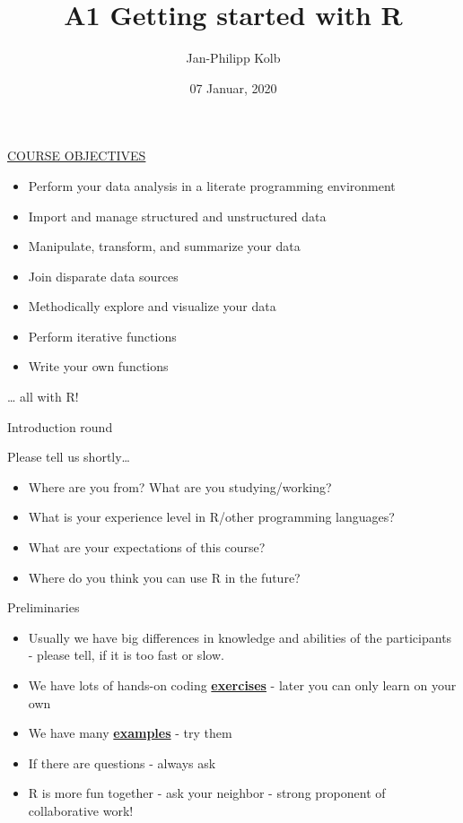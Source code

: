 \documentclass[
  10pt,
  ignorenonframetext,
]{beamer}
\title{A1 Getting started with R}
\author{Jan-Philipp Kolb}
\date{07 Januar, 2020}
\providecommand{\tightlist}{%
  \setlength{\itemsep}{0pt}\setlength{\parskip}{0pt}}
\begin{document}
\frame{\titlepage}

\begin{frame}{\href{http://uc-r.github.io/data_wrangling/week-1}{COURSE
OBJECTIVES}}
\protect\hypertarget{course-objectives}{}

\begin{itemize}
\tightlist
\item
  Perform your data analysis in a literate programming environment
\item
  Import and manage structured and unstructured data
\item
  Manipulate, transform, and summarize your data
\item
  Join disparate data sources
\item
  Methodically explore and visualize your data
\item
  Perform iterative functions
\item
  Write your own functions
\end{itemize}

\ldots{} all with R!

\end{frame}

\begin{frame}{Introduction round}
\protect\hypertarget{introduction-round}{}

\begin{block}{Please tell us shortly\ldots{}}

\begin{itemize}
\tightlist
\item
  Where are you from? What are you studying/working?
\item
  What is your experience level in R/other programming languages?
\item
  What are your expectations of this course?
\item
  Where do you think you can use R in the future?
\end{itemize}

\end{block}

\end{frame}

\begin{frame}{Preliminaries}
\protect\hypertarget{preliminaries}{}

\begin{itemize}
\tightlist
\item
  Usually we have big differences in knowledge and abilities of the
  participants - please tell, if it is too fast or slow.
\item
  We have lots of hands-on coding
  \href{http://web.math.ku.dk/~helle/R-intro/exercises.pdf}{\textbf{exercises}}
  - later you can only learn on your own
\item
  We have many \href{https://www.showmeshiny.com/}{\textbf{examples}} -
  try them
\item
  If there are questions - always ask
\item
  R is more fun together - ask your neighbor - strong proponent of
  collaborative work!
\end{itemize}

\end{frame}
\end{document}
